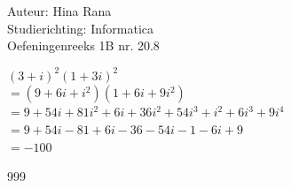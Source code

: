 \documentclass[a4paper]{article}
\begin{document}
\noindent \large Auteur: Hina Rana \\
\noindent \large Studierichting: Informatica\\
\noindent \large Oefeningenreeks 1B nr. 20.8\\

\medskip

\normalsize
$(3+i)^2 (1+3i)^2$\\

$=(9+6i+i^2)(1+6i+9i^2)$\\  
                       
$= 9+54i+81i^2 +6i+36i^2 +54i^3 +i^2 +6i^3 +9i^4$\\

$=9+54i-81+6i-36-54i-1-6i+9$\\

$=-100$ 

\begin{thebibliography}{999}
\end{thebibliography}
\end{document}
